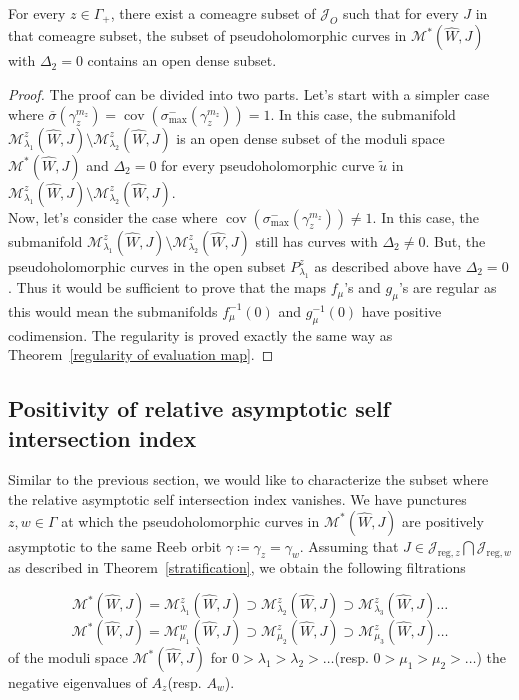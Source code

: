 \documentclass[11pt, a4paper]{amsart}
\newcommand{\cJ}{\mathcal{J}}
\newcommand{\cM}{\mathcal{M}}
\DeclareMathOperator{\cov}{cov}
\begin{document}
\begin{theorem} \label{delta2=0}
For every $z\in \Gamma_+$, there exist a comeagre subset of $\cJ_O$ such that for every $J$ in that comeagre subset, the subset of pseudoholomorphic curves in $\cM^*(\widehat{W},J)$ with $\Delta_2=0$ contains an open dense subset.
\end{theorem}

\begin{proof}

The proof can be divided into two parts. Let's start with a simpler case where $\overline{\sigma}(\gamma_z^{m_z})=\cov(\sigma_{\max}^{-}(\gamma_z^{m_z}))=1$.
In this case, the submanifold $\cM^z_{\lambda_1}(\widehat{W},J)\setminus \cM^z_{\lambda_2}(\widehat{W},J)$ is an open dense subset of the moduli space $\cM^*(\widehat{W},J)$ and $\Delta_2=0$ for every pseudoholomorphic curve $\tilde{u}$ in $\cM^z_{\lambda_1}(\widehat{W},J)\setminus \cM^z_{\lambda_2}(\widehat{W},J)$.\\

Now, let's consider the case where $\cov(\sigma_{\max}^{-}(\gamma_z^{m_z}))\neq 1$. In this case, the submanifold $\cM^z_{\lambda_1}(\widehat{W},J)\setminus \cM^z_{\lambda_2}(\widehat{W},J)$ still has curves with $\Delta_2\neq0$. But, the pseudoholomorphic curves in the open subset $P^z_{\lambda_1}$ as described above have $\Delta_2=0$. Thus it would be sufficient to prove that the maps $f_{\mu}$'s and $g_{\mu}$'s are regular as this would mean the submanifolds $f_{\mu}^{-1}(0)$ and $g_{\mu}^{-1}(0)$ have positive codimension. The regularity is proved exactly the same way as Theorem~\ref{regularity of evaluation map}.

\end{proof}

\subsection{Positivity of relative asymptotic self intersection index}
Similar to the previous section, we would like to characterize the subset where the relative asymptotic self intersection index vanishes. We have punctures $z,w \in \Gamma$ at which the pseudoholomorphic curves in $\cM^*(\widehat{W},J)$ are positively asymptotic to the same Reeb orbit $\gamma \coloneqq \gamma_z=\gamma_w$. Assuming that $J\in \cJ_{\mathrm{reg},z}\bigcap \cJ_{\mathrm{reg},w}$ as described in Theorem~\ref{stratification}, we obtain the following filtrations

$$\cM^*(\widehat{W},J) = \cM^z_{\lambda_1}(\widehat{W},J) \supset \cM^z_{\lambda_2}(\widehat{W},J) \supset \cM^z_{\lambda_3}(\widehat{W},J) \dots $$
$$\cM^*(\widehat{W},J) = \cM^w_{\mu_1}(\widehat{W},J) \supset \cM^z_{\mu_2}(\widehat{W},J) \supset \cM^z_{\mu_3}(\widehat{W},J) \dots $$
of the moduli space $\cM^*(\widehat{W},J)$ for $0>\lambda_1> \lambda_2> \dots $(resp. $0>\mu_1> \mu_2> \dots $) the negative eigenvalues of $A_z$(resp. $A_w$).\\
\end{document}
